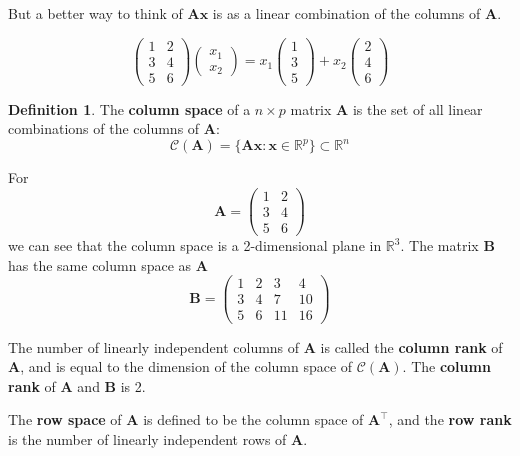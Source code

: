 \documentclass[
]{book}
\theoremstyle{definition}
\newtheorem{definition}{Definition}[chapter]
\theoremstyle{definition}
\theoremstyle{definition}
\theoremstyle{definition}
\theoremstyle{remark}
\begin{document}
But a better way to think of \(\mathbf A\mathbf x\) is as a linear combination of the columns of \(\mathbf A\).

\[ \left( \begin{array}{cc} 1 & 2\\ 3&4\\5&6\end{array}\right) \left(\begin{array}{c}x_1\\ x_2\end{array}\right) = x_1\left(\begin{array}{c}1\\3\\5 \end{array}\right)+x_2\left(\begin{array}{c}2\\4\\6 \end{array}\right)\]

\begin{definition}
\protect\hypertarget{def:rank}{}\label{def:rank}The \textbf{column space} of a \(n\times p\) matrix \(\mathbf A\) is the set of all linear combinations of the columns of \(\mathbf A\):
\[\mathcal{C}(\mathbf A) = \{\mathbf A\mathbf x:  \mathbf x\in \mathbb{R}^p\}\subset \mathbb{R}^n\]
\end{definition}

For \[\mathbf A=\left( \begin{array}{cc} 1 & 2\\ 3&4\\5&6\end{array}\right) \] we can see that the column space is a 2-dimensional plane in \(\mathbb{R}^3\). The matrix \(\mathbf B\) has the same column space as \(\mathbf A\)
\[\mathbf B=\left( \begin{array}{cccc} 1 & 2&3 &4\\ 3&4 &7&10\\5&6&11&16\end{array}\right) \]

The number of linearly independent columns of \(\mathbf A\) is called the \textbf{column rank} of \(\mathbf A\), and is equal to the dimension of the column space of \(\mathcal{C}(\mathbf A)\). The \textbf{column rank} of \(\mathbf A\) and \(\mathbf B\) is 2.

The \textbf{row space} of \(\mathbf A\) is defined to be the column space of \(\mathbf A^\top\), and the \textbf{row rank} is the number of linearly independent rows of \(\mathbf A\).
\end{document}
